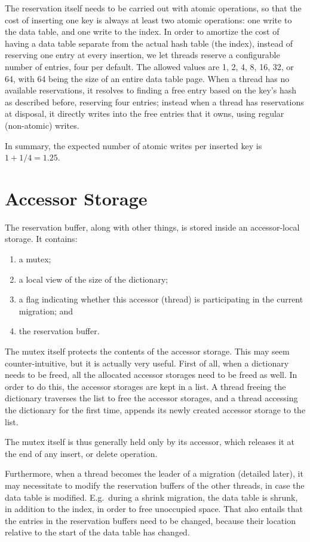 The reservation itself needs to be carried out with atomic operations, so that the cost of inserting one key is always at least two atomic operations: one write to the data table, and one write to the index.
In order to amortize the cost of having a data table separate from the actual hash table (the index), instead of reserving one entry at every insertion, we let threads reserve a configurable number of entries, four per default.
The allowed values are 1, 2, 4, 8, 16, 32, or 64, with 64 being the size of an entire data table page.
When a thread has no available reservations, it resolves to finding a free entry based on the key's hash as described before, reserving four entries; instead when a thread has reservations at disposal, it directly writes into the free entries that it owns, using regular (non-atomic) writes.

In summary, the expected number of atomic writes per inserted key is $1 + 1/4 = 1.25$.


\section{Accessor Storage}\label{sec:accessor-storage}

The reservation buffer, along with other things, is stored inside an accessor-local storage.
It contains:
\begin{enumerate}
	\item a mutex;
	\item a local view of the size of the dictionary;
	\item a flag indicating whether this accessor (thread) is participating in the current migration; and
	\item the reservation buffer.
\end{enumerate}

The mutex itself protects the contents of the accessor storage.
This may seem counter-intuitive, but it is actually very useful.
First of all, when a dictionary needs to be freed, all the allocated accessor storages need to be freed as well.
In order to do this, the accessor storages are kept in a list.
A thread freeing the dictionary traverses the list to free the accessor storages, and a thread accessing the dictionary for the first time, appends its newly created accessor storage to the list.

The mutex itself is thus generally held only by its accessor, which releases it at the end of any insert, or delete operation.

Furthermore, when a thread becomes the leader of a migration (detailed later), it may necessitate to modify the reservation buffers of the other threads, in case the data table is modified.
E.g.\ during a shrink migration, the data table is shrunk, in addition to the index, in order to free unoccupied space.
That also entails that the entries in the reservation buffers need to be changed, because their location relative to the start of the data table has changed.


